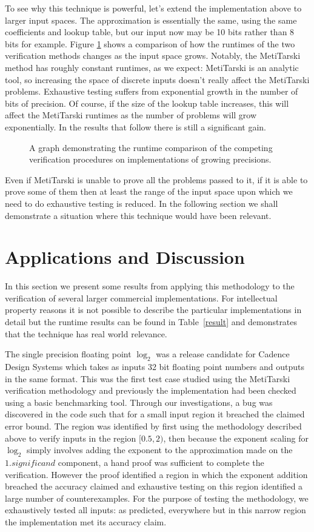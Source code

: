 \documentclass[a4]{article}
\begin{document}
To see why this technique is powerful, let's extend the implementation above to larger input spaces. The approximation is essentially the same, using the same coefficients and lookup table, but our input now may be 10 bits rather than 8 bits for example. Figure \ref{runtime_graph} shows a comparison of how the runtimes of the two verification methods changes as the input space grows. Notably, the MetiTarski method has roughly constant runtimes, as we expect: MetiTarski is an analytic tool, so increasing the space of discrete inputs doesn't really affect the MetiTarski problems. Exhaustive testing suffers from exponential growth in the number of bits of precision. Of course, if the size of the lookup table increases, this will affect the MetiTarski runtimes as the number of problems will grow exponentially. In the results that follow there is still a significant gain.
\begin{figure}
\centering

\caption{A graph demonstrating the runtime comparison of the competing verification procedures on implementations of growing precisions. \label{runtime_graph}
}
\end{figure}
Even if MetiTarski is unable to prove all the problems passed to it, if it is able to prove some of them then at least the range of the input space upon which we need to do exhaustive testing is reduced. In the following section we shall demonstrate a situation where this technique would have been relevant. 

\section{Applications and Discussion}
In this section we present some results from applying this methodology to the verification of several larger commercial implementations. For intellectual property reasons it is not possible to describe the particular implementations in detail but the runtime results can be found in Table~\ref{result} and demonstrates that the technique has real world relevance. 

The single precision floating point $\log_2$ was a release candidate for Cadence Design Systems which takes as inputs 32 bit floating point numbers and outputs in the same format. This was the first test case studied using the MetiTarski verification methodology and previously the implementation had been checked using a basic benchmarking tool. Through our investigations, a bug was discovered in the code such that for a small input region it breached the claimed error bound. The region was identified by first using the methodology described above to verify inputs in the region $[0.5,2)$, then because the exponent scaling for $\log_2$ simply involves adding the exponent to the approximation made on the $1.\textit{significand}$ component, a hand proof was sufficient to complete the verification. However the proof identified a region in which the exponent addition breached the accuracy claimed and exhaustive testing on this region identified a large number of counterexamples. For the purpose of testing the methodology, we exhaustively tested all inputs: as predicted, everywhere but in this narrow region the implementation met its accuracy claim.
\end{document}
